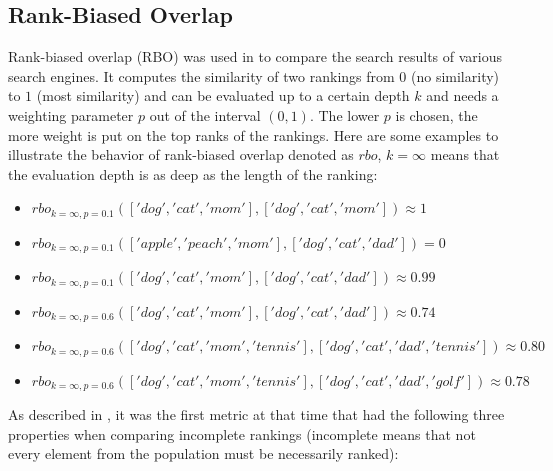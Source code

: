 \documentclass[draft,final]{thesisclass} %
\begin{document}
\subsection{Rank-Biased Overlap}
Rank-biased overlap (RBO) was used in \textcite{rank_biased_overlap} to compare the search results of various search engines.
It computes the similarity of two rankings from $0$ (no similarity) to $1$ (most similarity) and can be evaluated up to a certain depth $k$ and needs a weighting parameter $p$ out of the interval $(0,1)$.
The lower $p$ is chosen, the more weight is put on the top ranks of the rankings.
Here are some examples to illustrate the behavior of rank-biased overlap denoted as $rbo$, $k=\infty$ means that the evaluation depth is as deep as the length of the ranking:
\begin{itemize}
    \item $rbo_{k=\infty,p=0.1}(['dog','cat','mom'],['dog','cat','mom']) \approx 1$
    \item $rbo_{k=\infty,p=0.1}(['apple','peach','mom'],['dog','cat','dad']) = 0$
    \item $rbo_{k=\infty,p=0.1}(['dog','cat','mom'],['dog','cat','dad']) \approx 0.99$
    \item $rbo_{k=\infty,p=0.6}(['dog','cat','mom'],['dog','cat','dad']) \approx 0.74$
    \item $rbo_{k=\infty,p=0.6}(['dog','cat','mom','tennis'],['dog','cat','dad','tennis']) \approx 0.80$
    \item $rbo_{k=\infty,p=0.6}(['dog','cat','mom','tennis'],['dog','cat','dad','golf']) \approx 0.78$
\end{itemize}
As described in \textcite[1]{rank_biased_overlap}, it was the first metric at that time that had the following three properties when comparing incomplete rankings (incomplete means that not every element from the population must be necessarily ranked):
\end{document}
